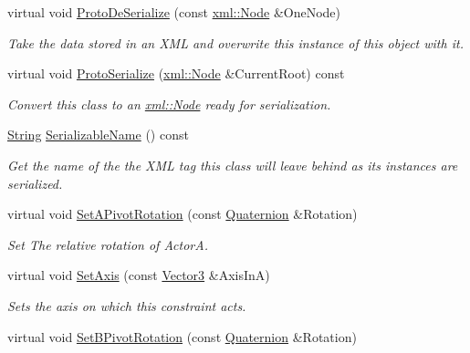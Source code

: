\begin{DoxyCompactItemize}
virtual void \hyperlink{classphys_1_1HingeConstraint_a63ca807d27fd21a24b4bcaa642febc77}{ProtoDeSerialize} (const \hyperlink{classphys_1_1xml_1_1Node}{xml::Node} \&OneNode)
\begin{DoxyCompactList}\small\item\em Take the data stored in an XML and overwrite this instance of this object with it. \item\end{DoxyCompactList}\item 
virtual void \hyperlink{classphys_1_1HingeConstraint_a04fac5312ddf891adcfff67e98f75861}{ProtoSerialize} (\hyperlink{classphys_1_1xml_1_1Node}{xml::Node} \&CurrentRoot) const 
\begin{DoxyCompactList}\small\item\em Convert this class to an \hyperlink{classphys_1_1xml_1_1Node}{xml::Node} ready for serialization. \item\end{DoxyCompactList}\item 
\hyperlink{namespacephys_aa03900411993de7fbfec4789bc1d392e}{String} \hyperlink{classphys_1_1HingeConstraint_a64804b6c98ed930f9acb05414defcdcc}{SerializableName} () const 
\begin{DoxyCompactList}\small\item\em Get the name of the the XML tag this class will leave behind as its instances are serialized. \item\end{DoxyCompactList}\item 
virtual void \hyperlink{classphys_1_1HingeConstraint_a7f597ee71540986b446a2771f25b791c}{SetAPivotRotation} (const \hyperlink{classphys_1_1Quaternion}{Quaternion} \&Rotation)
\begin{DoxyCompactList}\small\item\em Set The relative rotation of ActorA. \item\end{DoxyCompactList}\item 
virtual void \hyperlink{classphys_1_1HingeConstraint_a4eb0343f43b86fabef1fbe43857f9df8}{SetAxis} (const \hyperlink{classphys_1_1Vector3}{Vector3} \&AxisInA)
\begin{DoxyCompactList}\small\item\em Sets the axis on which this constraint acts. \item\end{DoxyCompactList}\item 
virtual void \hyperlink{classphys_1_1HingeConstraint_ae7c0db15c76fa1f7d78ca60d3c7368cd}{SetBPivotRotation} (const \hyperlink{classphys_1_1Quaternion}{Quaternion} \&Rotation)

\end{DoxyCompactItemize}
